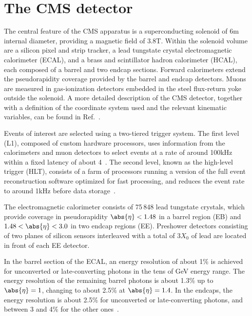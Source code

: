 
\section{The CMS detector} \label{section:CMS_Detector}

The central feature of the CMS apparatus is a superconducting solenoid of 6\unit{m} internal diameter, providing a magnetic field of 3.8\unit{T}. 
Within the solenoid volume are a silicon pixel and strip tracker, a lead tungstate crystal electromagnetic calorimeter (ECAL), and a brass and scintillator 
hadron calorimeter (HCAL), each composed of a barrel and two endcap sections. Forward calorimeters extend the pseudorapidity coverage provided by the barrel 
and endcap detectors. Muons are measured in gas-ionization detectors embedded in the steel flux-return yoke outside the solenoid. A more detailed description 
of the CMS detector, together with a definition of the coordinate system used and the relevant kinematic variables, can be found in Ref.~\cite{CMS:2008xjf}.

Events of interest are selected using a two-tiered trigger system. The first level (L1), composed of custom hardware processors, uses information from the 
calorimeters and muon detectors to select events at a rate of around 100\unit{kHz} within a fixed latency of about 4\mus~\cite{CMS:2020cmk}. The second level, 
known as the high-level trigger (HLT), consists of a farm of processors running a version of the full event reconstruction software optimized for fast processing, 
and reduces the event rate to around 1\unit{kHz} before data storage~\cite{CMS:2016ngn}.


The electromagnetic calorimeter consists of 75\,848 lead tungstate crystals, which provide coverage in pseudorapidity $\abs{\eta} < 1.48 $ in a barrel region (EB) 
and $1.48 < \abs{\eta} < 3.0$ in two endcap regions (EE). Preshower detectors consisting of two planes of silicon sensors interleaved with a total of $3 X_0$ of 
lead are located in front of each EE detector.

In the barrel section of the ECAL, an energy resolution of about 1\% is achieved for unconverted or late-converting photons in the tens of GeV energy range. 
The energy resolution of the remaining barrel photons is about 1.3\% up to $\abs{\eta} = 1$, changing to about 2.5\% at $\abs{\eta} = 1.4$. In the endcaps, 
the energy resolution is about 2.5\% for unconverted or late-converting photons, and between 3 and 4\% for the other ones~\cite{CMS:2015myp}.

